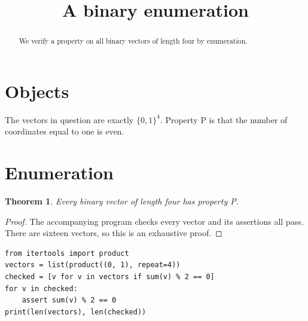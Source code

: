\documentclass{article}
\title{A binary enumeration}
\newtheorem{theorem}{Theorem}
\begin{document}
\begin{abstract}
We verify a property on all binary vectors of length four by enumeration.
\end{abstract}
\section{Objects}
The vectors in question are exactly $\{0,1\}^4$.
Property P is that the number of coordinates equal to one is even.
\section{Enumeration}
\begin{theorem}\label{thm:binary}
Every binary vector of length four has property P.
\end{theorem}
\begin{proof}
The accompanying program checks every vector and its assertions all pass.
There are sixteen vectors, so this is an exhaustive proof.
\end{proof}
\begin{verbatim}
from itertools import product
vectors = list(product((0, 1), repeat=4))
checked = [v for v in vectors if sum(v) % 2 == 0]
for v in checked:
    assert sum(v) % 2 == 0
print(len(vectors), len(checked))
\end{verbatim}
\end{document}
